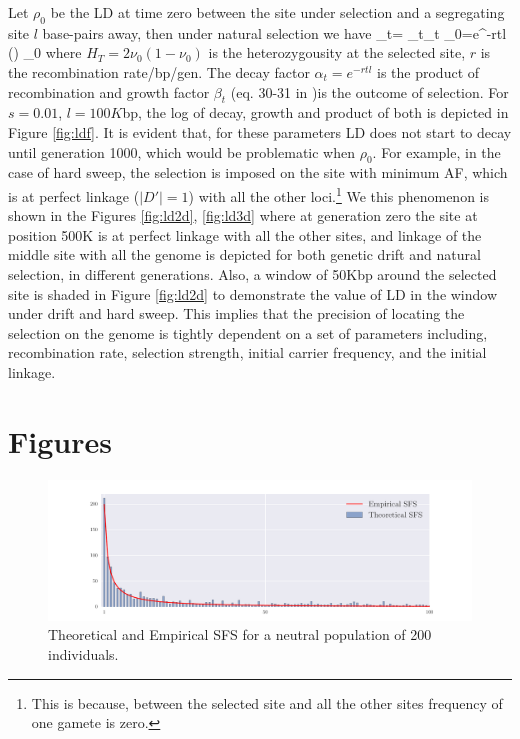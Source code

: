 \documentclass[11pt]{article}
\begin{document}
Let $\rho_0$ be the LD at time zero between the site under selection and a 
segregating site $l$ base-pairs away, then under natural selection we have
\beq
\rho_t= \alpha_t\beta_t \rho_0=e^{-rtl} \left(\right)  
\rho_0\label{eq:ldt}
\eeq
where $H_T=2\nu_0(1-\nu_0)$ is the heterozygousity at the selected site, $r$ is 
the recombination rate/bp/gen. The decay factor $\alpha_t=e^{-rtl}$ is the 
product of recombination and growth factor $\beta_t$ (eq. 30-31 in 
\cite{Stephan2006The})is the outcome of 
selection. For $s=0.01$, $l=100K$bp, the log of decay, growth and product of 
both is depicted in Figure \ref{fig:ldf}. It is evident that, for these 
parameters LD does not start to decay until generation 1000, which would be  
problematic when $\rho_0$. For example, in the case of hard sweep, the 
selection is imposed on the site with minimum AF, which is at perfect linkage 
($|D'|=1$) with all the other loci.\footnote{This is because, between the 
	selected site and all the other sites frequency of one gamete is zero.}
We this phenomenon is shown in the Figures \ref{fig:ld2d}, \ref{fig:ld3d} where 
at generation zero the site at position 500K is at perfect linkage with all the 
other sites, and linkage of the middle site with all the genome is depicted 
for both genetic drift and natural selection, in different generations.
Also, a window of 50Kbp around the selected site is shaded in Figure 
\ref{fig:ld2d} to demonstrate the value of LD in the window under drift and 
hard sweep. This implies that the precision of locating the selection on the 
genome is tightly dependent on a set of parameters including, recombination 
rate, selection strength, initial carrier frequency, and the initial linkage.



\section{Figures}

\begin{figure}[H]
	\centering
	\includegraphics[trim=1in 0.1in 1in 0.1in,clip,width=\textwidth]{sfs.pdf}
	\caption{Theoretical and Empirical SFS for a neutral population of 200 
	individuals.}	\label{fig:sfs}
\end{figure}
\end{document}
